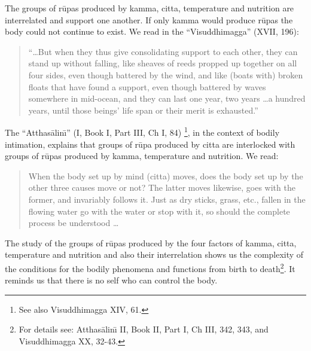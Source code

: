 \documentclass{book}
\begin{document}
The groups of r\=upas produced by kamma, citta, temperature and
nutrition are interrelated and support one another. If only kamma would
produce r\=upas the body could not continue to exist. We read in the
``Visuddhimagga'' (XVII, 196):




\begin{quote}\begin{flushleft}
``\ldots But when they thus give consolidating support to each other, they
can stand up without falling, like sheaves of reeds propped up together
on all four sides, even though battered by the wind, and like (boats
with) broken floats that have found a support, even though battered by
waves somewhere in mid-ocean, and they can last one year, two
years \ldots a hundred years, until those beings' life span or their
merit is exhausted.''
\end{flushleft}\end{quote}




The ``Atthas{\=a}lin\=\i'' (I, Book I, Part III, Ch I, 84)
\footnote{See also Visuddhimagga XIV, 61. }, in the context of bodily
intimation, explains that groups of r\=upa produced by citta are
interlocked with groups of r\=upas produced by kamma, temperature and
nutrition. We read:




\begin{quote}\begin{flushleft}
When the body set up by mind (citta) moves, does the body set up by the
other three causes move or not? The latter moves likewise, goes with
the former, and invariably follows it. Just as dry sticks, grass, etc., 
fallen in the flowing water go with the water or stop with it, so
should the complete process be understood \ldots

\end{flushleft}\end{quote}



The study of the groups of r\=upas produced by the four factors of
kamma, citta, temperature and nutrition and also their interrelation
shows us the complexity of the conditions for the bodily phenomena and
functions from birth to death\footnote{For details see:
Atthas{\=a}lin\=\i{}  II, Book II, Part I, Ch III, 342, 343, and
Visuddhimagga XX, 32-43.}. It reminds us that there is no self who
can control the body. 
\end{document}

